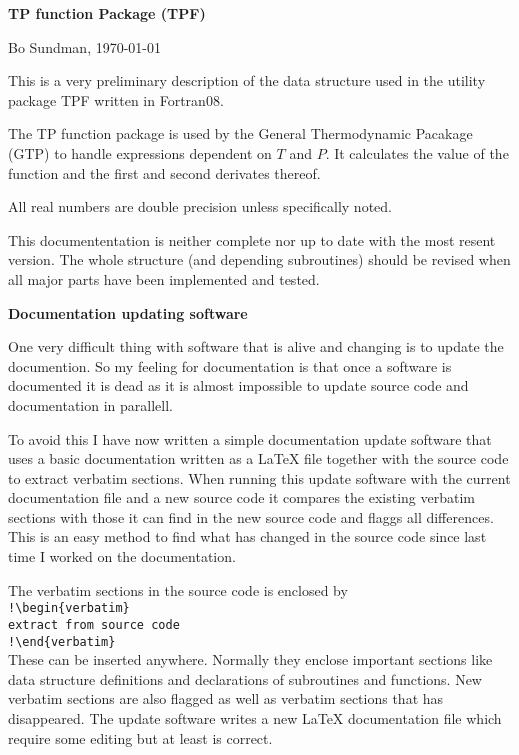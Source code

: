 \documentclass[12pt]{article}
\begin{document}
\begin{center}

{\large \bf TP function Package (TPF)}

Bo Sundman, \today

\end{center}

This is a very preliminary description of the data structure used in
the utility package TPF written in Fortran08.

The TP function package is used by the General Thermodynamic Pacakage
(GTP) to handle expressions dependent on $T$ and $P$.  It calculates
the value of the function and the first and second derivates thereof.

All real numbers are double precision unless specifically noted.

This documententation is neither complete nor up to date with the most
resent version.  The whole structure (and depending subroutines)
should be revised when all major parts have been implemented and
tested.

\vspace{5mm}

{\bf Documentation updating software}

One very difficult thing with software that is alive and changing is
to update the documention.  So my feeling for documentation is that
once a software is documented it is dead as it is almost impossible to
update source code and documentation in parallell.

To avoid this I have now written a simple documentation update
software that uses a basic documentation written as a LaTeX file
together with the source code to extract verbatim sections.  When
running this update software with the current documentation file and a
new source code it compares the existing verbatim sections with those
it can find in the new source code and flaggs all differences.  This
is an easy method to find what has changed in the source code since
last time I worked on the documentation.

The verbatim sections in the source code is enclosed by\\
\verb/!\begin{verbatim}/\\
\verb/extract from source code /\\
\verb/!\end{verbatim} /\\
These can be inserted anywhere.  Normally they enclose important
sections like data structure definitions and declarations of
subroutines and functions.  New verbatim sections are also flagged as
well as verbatim sections that has disappeared.  The update software
writes a new LaTeX documentation file which require some editing but
at least is correct.
\end{document}
